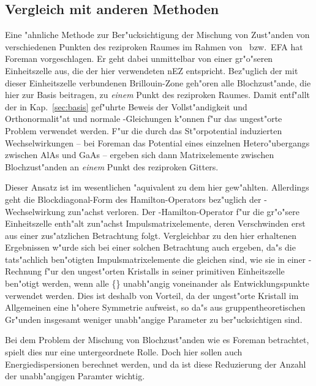 \subsection{Vergleich mit anderen Methoden}
\label{sec:vergleich}

Eine "ahnliche Methode zur Ber"ucksichtigung der Mischung von Zust"anden von
verschiedenen Punkten des reziproken Raumes im Rahmen von \kdotp\ bzw.\ EFA
hat Foreman \cite{fore:98-2} vorgeschlagen. Er geht dabei unmittelbar von
einer gr"o"seren Einheitszelle aus, die der hier verwendeten nEZ entspricht.
Bez"uglich der mit dieser Einheitszelle verbundenen Brillouin-Zone geh"oren
alle Blochzust"ande, die hier zur Basis beitragen, zu \emph{einem} Punkt des
reziproken Raumes. Damit entf"allt der in Kap.~\ref{sec:basis} gef"uhrte
Beweis der Vollst"andigkeit und Orthonormalit"at und normale
\kdotp-Gleichungen k"onnen f"ur das ungest"orte Problem verwendet werden. F"ur
die durch das St"orpotential induzierten Wechselwirkungen -- bei Foreman das
Potential eines einzelnen Hetero"ubergangs zwischen AlAs und GaAs -- ergeben
sich dann Matrixelemente zwischen Blochzust"anden an \emph{einem} Punkt des
reziproken Gitters. 

Dieser Ansatz ist im wesentlichen "aquivalent zu dem hier
gew"ahlten.  Allerdings geht die Blockdiagonal-Form des Hamilton-Operators
bez"uglich der \kdotp-Wechselwirkung zun"achst verloren. Der
\kdotp-Hamilton-Operator f"ur die gr"o"sere Einheitszelle enth"alt zun"achst
Impulsmatrixelemente, deren Verschwinden erst aus einer zus"atzlichen
Betrachtung folgt. Vergleichbar zu den hier erhaltenen Ergebnissen w"urde sich
bei einer solchen Betrachtung auch ergeben, da"s die tats"achlich ben"otigten
Impulsmatrixelemente die gleichen sind, wie sie in einer \kdotp-Rechnung f"ur
den ungest"orten Kristalls in seiner primitiven Einheitszelle ben"otigt
werden, wenn alle \{\set\} unabh"angig voneinander als Entwicklungspunkte
verwendet werden. Dies ist deshalb von Vorteil, da der ungest"orte Kristall im
Allgemeinen eine h"ohere Symmetrie aufweist, so da"s aus gruppentheoretischen
Gr"unden insgesamt weniger unabh"angige Parameter zu ber"ucksichtigen sind.

Bei dem Problem der Mischung von Blochzust"anden wie es Foreman betrachtet,
spielt dies nur eine untergeordnete Rolle. Doch hier sollen auch
Energiedispersionen berechnet werden, und da ist diese Reduzierung der Anzahl
der unabh"angigen Paramter wichtig. 

